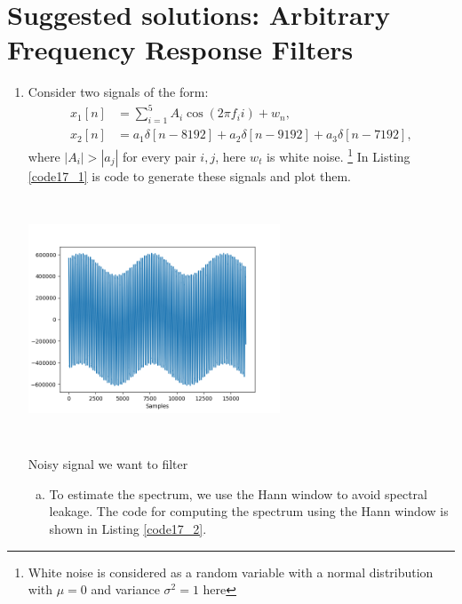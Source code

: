 \newpage
\section{Suggested solutions: Arbitrary Frequency Response Filters}
\begin{enumerate}
\item Consider two signals of the form:
\begin{align*}
    x_{1}[n]&=\sum_{i=1}^{5}A_{i}\cos(2\pi f_{i}i)+w_{n}, \\
    x_{2}[n]&=a_1\delta[n-8192] + a_2\delta[n-9192] + a_3\delta[n-7192],
\end{align*}
where $|A_{i}|>|a_{j}|$ for every pair $i,j$, here $w_t$ is white noise.
\footnote{White noise is considered as a random variable with a normal distribution 
with $\mu=0$ and variance $\sigma^{2}=1$ here} In Listing \ref{code17_1} is code to generate these signals and plot them. 



\begin{marginfigure}
    \centering
    \includegraphics[width=7.5cm,height=7.2cm]{ch17/figures/ex17_1.png}
    \caption{Noisy signal we want to filter}
    \label{fig17_1}
\end{marginfigure}

\begin{enumerate}[a)]
\item To estimate the spectrum, we use the Hann window to avoid spectral leakage. 
The code for computing the spectrum using the Hann window is shown in Listing \ref{code17_2}.




\end{enumerate}
\end{enumerate}
